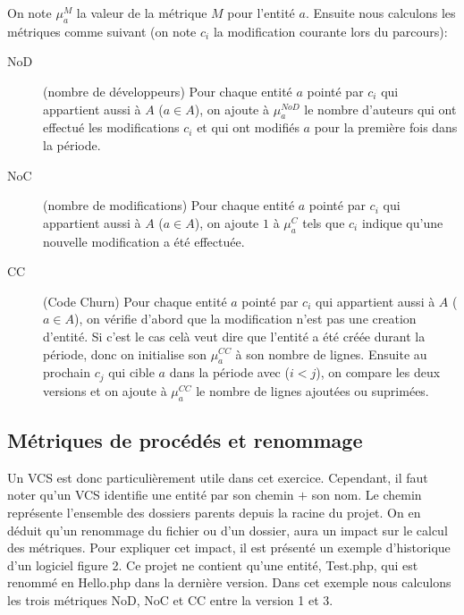  On note $\mu_{a}^{M}$ la valeur de la métrique $M$ pour l'entité $a$. Ensuite nous calculons les métriques comme suivant (on note $c_i$ la modification courante lors du parcours):
\begin{description}
	\item[NoD] (nombre de développeurs) Pour chaque entité $a$ pointé par $c_i$ qui appartient aussi à $A$ ($a \in A$), on ajoute à $\mu_{a}^{NoD}$ le nombre d'auteurs qui ont effectué les modifications $c_i$ et qui ont modifiés $a$ pour la première fois dans la période.
	\item[NoC] (nombre de modifications) Pour chaque entité $a$ pointé par $c_i$ qui appartient aussi à $A$ ($a \in A$), on ajoute $1$ à $\mu_{a}^{C}$ tels que $c_i$ indique qu'une nouvelle modification a été effectuée.
	\item[CC] (Code Churn) Pour chaque entité $a$ pointé par $c_i$ qui appartient aussi à $A$ ($a \in A$), on vérifie d'abord que la modification n'est pas une creation d'entité. Si c'est le cas celà veut dire que l'entité a été créée durant la période, donc on initialise son $\mu_{a}^{CC}$ à son nombre de lignes. Ensuite au prochain $c_j$ qui cible $a$ dans la période avec ($i < j$), on compare les deux versions et on ajoute à $\mu_{a}^{CC}$ le nombre de lignes ajoutées ou suprimées.
\end{description}


\subsection{Métriques de procédés et renommage}

Un VCS est donc particulièrement utile dans cet exercice. Cependant, il faut noter qu'un VCS identifie une entité par son chemin $+$ son nom. Le chemin représente l'ensemble des dossiers parents depuis la racine du projet. On en déduit qu'un renommage du fichier ou d'un dossier, aura un impact sur le calcul des métriques. Pour expliquer cet impact, il est présenté un exemple d'historique d'un logiciel figure 2. Ce projet ne contient qu'une entité, Test.php, qui est renommé en Hello.php dans la dernière version. Dans cet exemple nous calculons les trois métriques NoD, NoC et CC entre la version 1 et 3.\\

